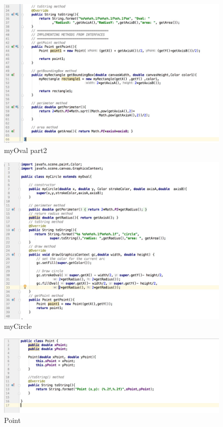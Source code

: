 \documentclass[a4paper,12pt]{article}
\begin{document}
\begin{figure}[H]
   \centering
   \includegraphics[width = 17cm]{myOval_part2} %
   \caption{myOval part2}
   \label{myOval part2}
\end{figure}


\begin{figure}[H]
   \centering
   \includegraphics[width = 17cm]{myCircle} %
   \caption{myCircle}
   \label{myCircle}
\end{figure}


\begin{figure}[H]
   \centering
   \includegraphics[width = 17cm]{Point} %
   \caption{Point}
   \label{Point}
\end{figure}
\end{document}
